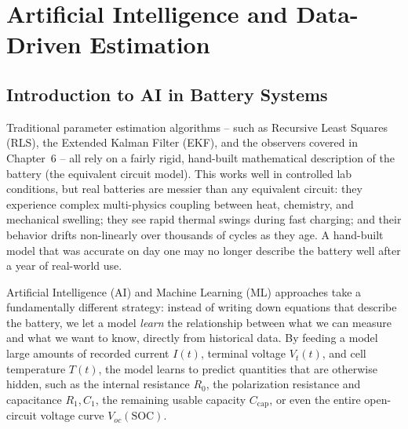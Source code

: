 
\chapter{Artificial Intelligence and Data-Driven Estimation}
\label{ch:ai_data_driven}

\section{Introduction to AI in Battery Systems}
\label{sec:ai_intro}

Traditional parameter estimation algorithms -- such as Recursive Least Squares (RLS), the Extended Kalman Filter (EKF), and the observers covered in Chapter~6 -- all rely on a fairly rigid, hand-built mathematical description of the battery (the equivalent circuit model). This works well in controlled lab conditions, but real batteries are messier than any equivalent circuit: they experience complex multi-physics coupling between heat, chemistry, and mechanical swelling; they see rapid thermal swings during fast charging; and their behavior drifts non-linearly over thousands of cycles as they age. A hand-built model that was accurate on day one may no longer describe the battery well after a year of real-world use.

Artificial Intelligence (AI) and Machine Learning (ML) approaches take a fundamentally different strategy: instead of writing down equations that describe the battery, we let a model \emph{learn} the relationship between what we can measure and what we want to know, directly from historical data. By feeding a model large amounts of recorded current $I(t)$, terminal voltage $V_t(t)$, and cell temperature $T(t)$, the model learns to predict quantities that are otherwise hidden, such as the internal resistance $R_0$, the polarization resistance and capacitance $R_1, C_1$, the remaining usable capacity $C_{\text{cap}}$, or even the entire open-circuit voltage curve $V_{oc}(\text{SOC})$.

